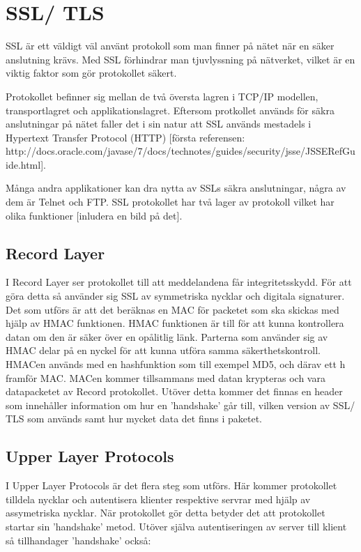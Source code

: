 \section{SSL/ TLS}
SSL är ett väldigt väl använt protokoll som man finner på nätet när en säker anslutning krävs. Med SSL förhindrar man tjuvlyssning på nätverket, vilket är en viktig faktor som gör protokollet säkert. 

Protokollet befinner sig mellan de två översta lagren i TCP/IP modellen, transportlagret och applikationslagret.
Eftersom protkollet används för säkra anslutningar på nätet faller det i sin natur att SSL används mestadels i Hypertext Transfer Protocol (HTTP) [första referensen: http://docs.oracle.com/javase/7/docs/technotes/guides/security/jsse/JSSERefGuide.html]. 

Många andra applikationer kan dra nytta av SSLs säkra anslutningar, några av dem är Telnet och FTP. 
SSL protokollet har två lager av protokoll vilket har olika funktioner [inludera en bild på det].

\subsection{Record Layer}
I Record Layer ser protokollet till att meddelandena får integritetsskydd. För att göra detta så använder sig SSL av symmetriska nycklar och digitala signaturer. Det som utförs är att det beräknas en MAC för packetet som ska skickas med hjälp av HMAC funktionen. HMAC funktionen är till för att kunna kontrollera datan om den är säker över en opålitlig länk. Parterna som använder sig av HMAC delar på en nyckel för att kunna utföra samma säkerthetskontroll. HMACen används med en hashfunktion som till exempel MD5, och därav ett h framför MAC. MACen kommer tillsammans med datan krypteras och vara datapacketet av Record protokollet. Utöver detta kommer det finnas en header som innehåller information om hur en 'handshake' går till, vilken version av SSL/ TLS som används samt hur mycket data det finns i paketet.

\subsection{Upper Layer Protocols}
I Upper Layer Protocols är det flera steg som utförs. Här kommer protokollet tilldela nycklar och autentisera klienter respektive servrar med hjälp av assymetriska nycklar. När protokollet gör detta betyder det att protokollet startar sin 'handshake' metod. Utöver själva autentiseringen av server till klient så tillhandager 'handshake' också:


